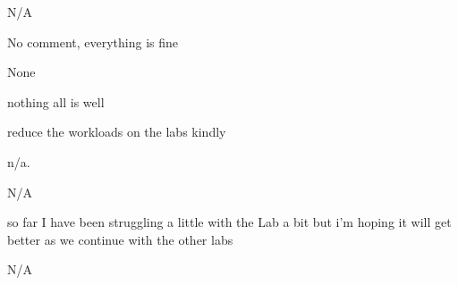 \documentclass[
]{article}
\begin{document}
\begin{enumerate}
\begin{itemize}
\begin{itemize}
\begin{itemize}
        N/A

        No comment, everything is fine

        None

        nothing all is well

        reduce the workloads on the labs kindly

        n/a.

        N/A

        so far I have been struggling a little with the Lab a bit but
        i'm hoping it will get better as we continue with the other labs

        N/A
      \end{itemize}
    \end{itemize}
  \end{itemize}
\end{enumerate}
\end{document}
